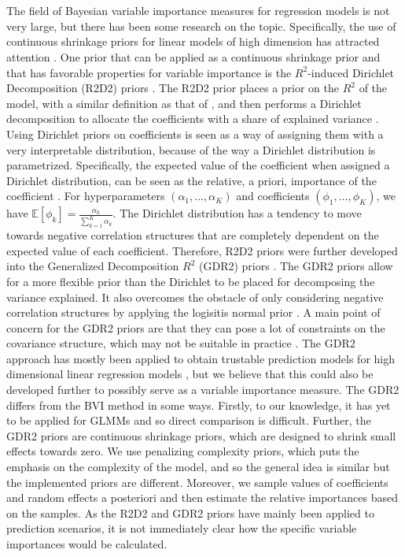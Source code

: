 \\
\\
The field of Bayesian variable importance measures for regression models is not very large, but there has been some research on the topic. Specifically, the use of continuous shrinkage priors for linear models of high dimension has attracted attention \citep{aguilar2024generalized}. One prior that can be applied as a continuous shrinkage prior and that has favorable properties for variable importance is the $R^2$-induced Dirichlet Decomposition (R2D2) priors \citet{zhang2020bayesian}. The R2D2 prior places a prior on the $R^2$ of the model, with a similar definition as that of \citet{gelman2017rsquared}, and then performs a Dirichlet decomposition to allocate the coefficients with a share of explained variance \citep{aguilar2024generalized}. Using Dirichlet priors on coefficients is seen as a way of assigning them with a very interpretable distribution, because of the way a Dirichlet distribution is parametrized. Specifically, the expected value of the coefficient when assigned a Dirichlet distribution, can be seen as the relative, a priori, importance of the coefficient \citep{aguilar2024generalized}. For hyperparameters $(\alpha_1, ..., \alpha_K)$ and coefficients $(\phi_1, ..., \phi_K)$, we have $\mathbb{E}[\phi_k]=\frac{\alpha_k}{\sum_{k=1}^K\alpha_k}$. The Dirichlet distribution has a tendency to move towards negative correlation structures that are completely dependent on the expected value of each coefficient. Therefore, R2D2 priors were further developed into the Generalized Decomposition $R^2$ (GDR2) priors \citep{aguilar2024generalized}. The GDR2 priors allow for a more flexible prior than the Dirichlet to be placed for decomposing the variance explained. It also overcomes the obstacle of only considering negative correlation structures by applying the logisitis normal prior \citep{aguilar2024generalized}. A main point of concern for the GDR2 priors are that they can pose a lot of constraints on the covariance structure, which may not be suitable in practice \citep[and references therein]{aguilar2024generalized}. The GDR2 approach has mostly been applied to obtain trustable prediction models for high dimensional linear regression models \citep{aguilar2024generalized}, but we believe that this could also be developed further to possibly serve as a variable importance measure. The GDR2 differs from the BVI method in some ways. Firstly, to our knowledge, it has yet to be applied for GLMMs and so direct comparison is difficult. Further, the GDR2 priors are continuous shrinkage priors, which are designed to shrink small effects towards zero. We use penalizing complexity priors, which puts the emphasis on the complexity of the model, and so the general idea is similar but the implemented priors are different. Moreover, we sample values of coefficients and random effects a posteriori and then estimate the relative importances based on the samples. As the R2D2 and GDR2 priors have mainly been applied to prediction scenarios, it is not immediately clear how the specific variable importances would be calculated. 

